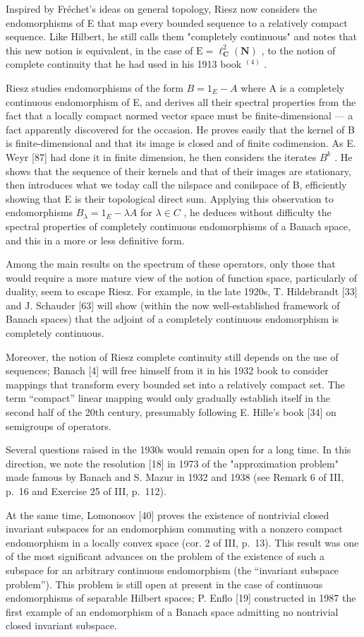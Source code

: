 Inspired by Fréchet's ideas on general topology, Riesz now considers the endomorphisms of E that map every bounded sequence to a relatively compact sequence. Like Hilbert, he still calls them "completely continuous" and notes that this new notion is equivalent, in the case of \(\mathrm{E} = \ell_{\mathbf{C}}^{2}(\mathbf{N})\) , to the notion of complete continuity that he had used in his 1913 book \(^{(4)}\) .

Riesz studies endomorphisms of the form \(B = 1_{E} - A\) where A is a completely continuous endomorphism of E, and derives all their spectral properties from the fact that a locally compact normed vector space must be finite-dimensional — a fact apparently discovered for the occasion. He proves easily that the kernel of B is finite-dimensional and that its image is closed and of finite codimension. As E. Weyr [87] had done it in finite dimension, he then considers the iterates \(B^{k}\) . He shows that the sequence of their kernels and that of their images are stationary, then introduces what we today call the nilspace and conilspace of B, efficiently showing that E is their topological direct sum. Applying this observation to endomorphisms \(B_{\lambda} = 1_{E} - \lambda A\) for \(\lambda \in C\) , he deduces without difficulty the spectral properties of completely continuous endomorphisms of a Banach space, and this in a more or less definitive form.

Among the main results on the spectrum of these operators, only those that would require a more mature view of the notion of function space, particularly of duality, seem to escape Riesz. For example, in the late 1920s, T. Hildebrandt [33] and J. Schauder [63] will show (within the now well-established framework of Banach spaces) that the adjoint of a completely continuous endomorphism is completely continuous.

Moreover, the notion of Riesz complete continuity still depends on the use of sequences; Banach [4] will free himself from it in his 1932 book to consider mappings that transform every bounded set into a relatively compact set. The term “compact” linear mapping would only gradually establish itself in the second half of the 20th century, presumably following E. Hille's book [34] on semigroups of operators.

Several questions raised in the 1930s would remain open for a long time. In this direction, we note the resolution [18] in 1973 of the "approximation problem" made famous by Banach and S. Mazur in 1932 and 1938 (see Remark 6 of III, p.~16 and Exercise 25 of III, p.~112).

At the same time, Lomonosov [40] proves the existence of nontrivial closed invariant subspaces for an endomorphism commuting with a nonzero compact endomorphism in a locally convex space (cor. 2 of III, p.~13). This result was one of the most significant advances on the problem of the existence of such a subspace for an arbitrary continuous endomorphism (the “invariant subspace problem”). This problem is still open at present in the case of continuous endomorphisms of separable Hilbert spaces; P. Enflo [19] constructed in 1987 the first example of an endomorphism of a Banach space admitting no nontrivial closed invariant subspace.